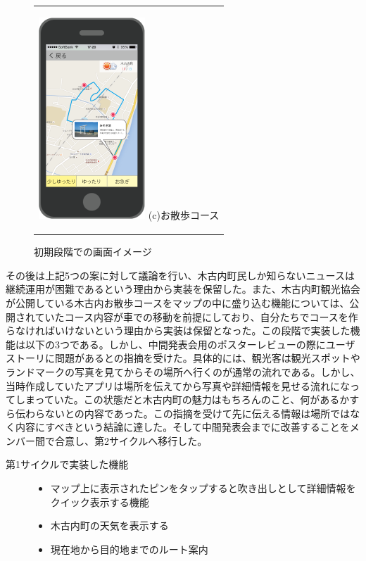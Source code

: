 \begin{figure}[htbp]
\begin{center}
\begin{tabular}{c}
      \begin{minipage}{0.33\hsize}
        \begin{center}
\includegraphics[width=4cm, bb=0 0 302 572]{5.2_sanpo.png}
          \hspace{1cm} (c)お散歩コース
        \end{center}
      \end{minipage}

    \end{tabular}
    \caption{初期段階での画面イメージ}
    \label{fig:lena}
  \end{center}
\end{figure}

その後は上記5つの案に対して議論を行い、木古内町民しか知らないニュースは継続運用が困難であるという理由から実装を保留した。また、木古内町観光協会が公開している木古内お散歩コースをマップの中に盛り込む機能については、公開されていたコース内容が車での移動を前提にしており、自分たちでコースを作らなければいけないという理由から実装は保留となった。この段階で実装した機能は以下の3つである。しかし、中間発表会用のポスターレビューの際にユーザストーリに問題があるとの指摘を受けた。具体的には、観光客は観光スポットやランドマークの写真を見てからその場所へ行くのが通常の流れである。しかし、当時作成していたアプリは場所を伝えてから写真や詳細情報を見せる流れになってしまっていた。この状態だと木古内町の魅力はもちろんのこと、何があるかすら伝わらないとの内容であった。この指摘を受けて先に伝える情報は場所ではなく内容にすべきという結論に達した。そして中間発表会までに改善することをメンバー間で合意し、第2サイクルへ移行した。
\begin{description}
\item[第1サイクルで実装した機能]\mbox{}
\begin{itemize}
 \item マップ上に表示されたピンをタップすると吹き出しとして詳細情報をクイック表示する機能
 \item 木古内町の天気を表示する
 \item 現在地から目的地までのルート案内
\end{itemize}
\end{description}

